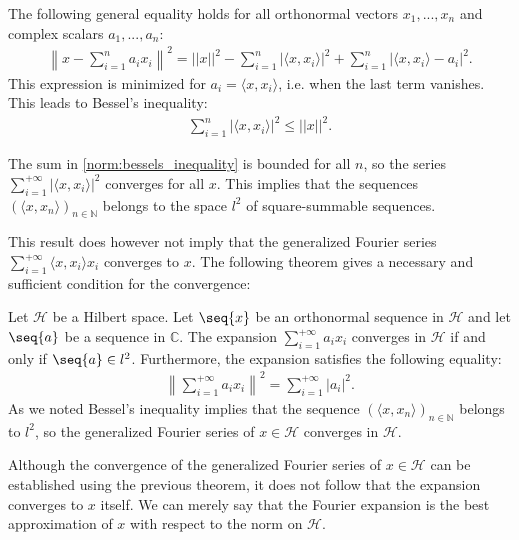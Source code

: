     \begin{property}
        The following general equality holds for all orthonormal vectors $x_1, ..., x_n$ and complex scalars $a_1, ..., a_n$:
        \begin{gather}
            \left\lVert x - \sum_{i=1}^n a_ix_i\right\rVert^2 = ||x||^2 - \sum_{i=1}^n|\langle x, x_i\rangle|^2 + \sum_{i=1}^n|\langle x, x_i\rangle - a_i|^2.
        \end{gather}
        This expression is minimized for $a_i = \langle x, x_i\rangle$, i.e. when the last term vanishes. This leads to Bessel's inequality:
        \begin{gather}
            \label{norm:bessels_inequality}
            \sum_{i=1}^n|\langle x, x_i\rangle|^2 \leq ||x||^2.
        \end{gather}
    \end{property}
    \begin{result}
        The sum in \ref{norm:bessels_inequality} is bounded for all $n$, so the series $\sum_{i=1}^{+\infty}|\langle x,x_i\rangle|^2$ converges for all $x$. This implies that the sequences $(\langle x, x_n\rangle)_{n\in\mathbb{N}}$ belongs to the space $l^2$ of square-summable sequences.
    \end{result}

    This result does however not imply that the generalized Fourier series $\sum_{i=1}^{+\infty}\langle x, x_i\rangle x_i$ converges to $x$. The following theorem gives a necessary and sufficient condition for the convergence:
    \begin{theorem}
        Let $\mathcal{H}$ be a Hilbert space. Let $\seq{x}$ be an orthonormal sequence in $\mathcal{H}$ and let $\seq{a}$ be a sequence in $\mathbb{C}$. The expansion $\sum_{i=1}^{+\infty}a_ix_i$ converges in $\mathcal{H}$ if and only if $\seq{a}\in l^2$. Furthermore, the expansion satisfies the following equality:
        \begin{gather}
            \left\lVert\sum_{i=1}^{+\infty}a_ix_i\right\rVert^2 = \sum_{i=1}^{+\infty}|a_i|^2.
        \end{gather}
        As we noted Bessel's inequality implies that the sequence $(\langle x, x_n\rangle)_{n\in\mathbb{N}}$ belongs to $l^2$, so the generalized Fourier series of $x\in\mathcal{H}$ converges in $\mathcal{H}$.
    \end{theorem}
    \begin{remark}
        Although the convergence of the generalized Fourier series of $x\in\mathcal{H}$ can be established using the previous theorem, it does not follow that the expansion converges to $x$ itself. We can merely say that the Fourier expansion is the best approximation of $x$ with respect to the norm on $\mathcal{H}$.
    \end{remark}

